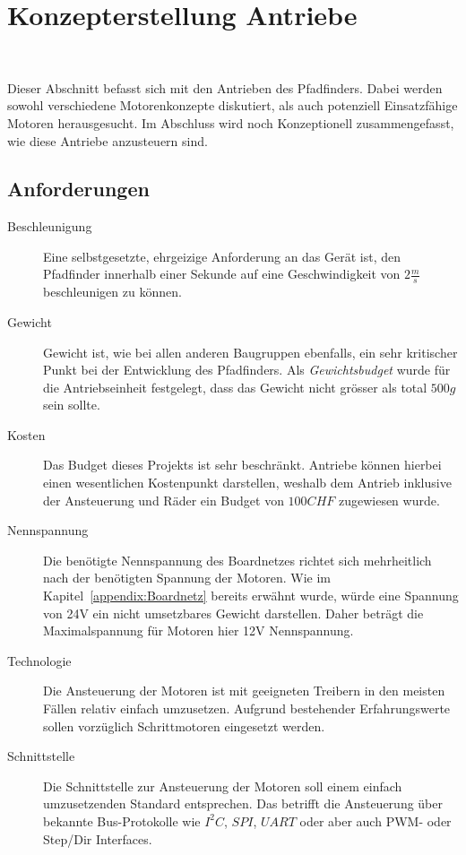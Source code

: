 \documentclass[main.tex]{subfiles} %
\begin{document}
\section{Konzepterstellung Antriebe}~\label{appendix:Antriebe}

Dieser Abschnitt befasst sich mit den Antrieben des Pfadfinders. Dabei werden
sowohl verschiedene Motorenkonzepte diskutiert, als auch potenziell
Einsatzfähige Motoren herausgesucht. Im Abschluss wird noch Konzeptionell
zusammengefasst, wie diese Antriebe anzusteuern sind.

\subsection*{Anforderungen}

\begin{description}
    \item[Beschleunigung] Eine selbstgesetzte, ehrgeizige Anforderung an das Gerät ist,
          den Pfadfinder innerhalb einer Sekunde auf eine Geschwindigkeit von $2
              \frac{m}{s} $ beschleunigen zu können.

    \item[Gewicht] Gewicht ist, wie bei allen anderen Baugruppen ebenfalls, ein sehr
          kritischer Punkt bei der Entwicklung des Pfadfinders. Als
          \textit{Gewichtsbudget} wurde für die Antriebseinheit festgelegt, dass das
          Gewicht nicht grösser als total $500 g$ sein sollte.

    \item[Kosten] Das Budget dieses Projekts ist sehr beschränkt. Antriebe können hierbei
          einen wesentlichen Kostenpunkt darstellen, weshalb dem Antrieb inklusive der
          Ansteuerung und Räder ein Budget von $100 CHF$ zugewiesen wurde.

    \item[Nennspannung] Die benötigte Nennspannung des Boardnetzes richtet sich
          mehrheitlich nach der benötigten Spannung der Motoren. Wie im
          Kapitel~\ref{appendix:Boardnetz} bereits erwähnt wurde, würde eine Spannung von
          24V ein nicht umsetzbares Gewicht darstellen. Daher beträgt die Maximalspannung
          für Motoren hier 12V Nennspannung.

    \item[Technologie] Die Ansteuerung der Motoren ist mit geeigneten Treibern in den
          meisten Fällen relativ einfach umzusetzen. Aufgrund bestehender Erfahrungswerte
          sollen vorzüglich Schrittmotoren eingesetzt werden.

    \item[Schnittstelle] Die Schnittstelle zur Ansteuerung der Motoren soll einem einfach
          umzusetzenden Standard entsprechen. Das betrifft die Ansteuerung über bekannte
          Bus-Protokolle wie $I^2C$, $SPI$, $UART$ oder aber auch PWM- oder Step/Dir
          Interfaces.

\end{description}
\end{document}
